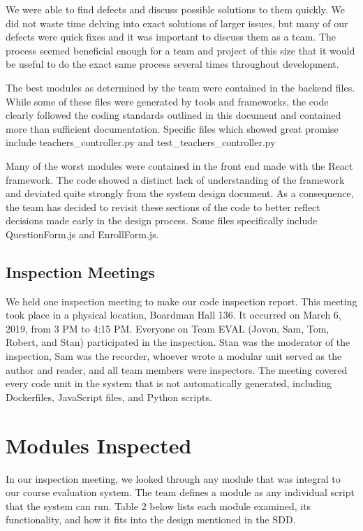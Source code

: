 \documentclass{article}
\begin{document}
We were able to find defects and discuss possible solutions to them quickly. We did not waste time delving into exact solutions of larger issues, but many of our defects were quick fixes and it was important to discuss them as a team. The process seemed beneficial enough for a team and project of this size that it would be useful to do the exact same process several times throughout development.

The best modules as determined by the team were contained in the backend files. While some of these files were generated by tools and frameworks, the code clearly followed the coding standards outlined in this document and contained more than sufficient documentation. Specific files which showed great promise include teachers_controller.py and test_teachers_controller.py

Many of the worst modules were contained in the front end made with the React framework. The code showed a distinct lack of understanding of the framework and deviated quite strongly from the system design document. As a consequence, the team has decided to revisit these sections of the code to better reflect decisions made early in the design process. Some files specifically include QuestionForm.js and EnrollForm.js. 

\subsection{Inspection Meetings}

We held one inspection meeting to make our code inspection report. This meeting took place in a physical location, Boardman Hall 136. It occurred on March 6, 2019, from 3 PM to 4:15 PM. Everyone on Team EVAL (Jovon, Sam, Tom, Robert, and Stan) participated in the inspection. Stan was the moderator of the inspection, Sam was the recorder, whoever wrote a modular unit served as the author and reader, and all team members were inspectors. The meeting covered every code unit in the system that is not automatically generated, including Dockerfiles, JavaScript files, and Python scripts.

\section{Modules Inspected}

In our inspection meeting, we looked through any module that was integral to our course evaluation system. The team defines a module as any individual script that the system can run. Table 2 below lists each module examined, its functionality, and how it fits into the design mentioned in the SDD.
\end{document}
